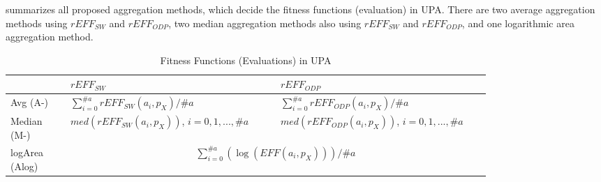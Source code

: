 
 summarizes all proposed aggregation methods, which decide the fitness functions (evaluation) in UPA. There are two average aggregation methods using $rEFF_{SW}$ and $rEFF_{ODP}$, two median aggregation methods also using $rEFF_{SW}$ and $rEFF_{ODP}$, and one logarithmic area aggregation method. 


\begin{table}[h]
	\caption{Fitness Functions (Evaluations) in UPA}
	\vspace{-8pt}
	\label{tab:fit}
	\centering
	\begin{tabular}{p{0.10\linewidth}|p{0.35\linewidth}|p{0.35\linewidth}}
		\toprule
		& $rEFF_{SW}$ & $rEFF_{ODP}$ \\
		\midrule
		\hline
		Avg (A-)& \(\displaystyle \sum_{i=0}^{\#a} rEFF_{SW}(a_{i}, p_{X})/\#a \) & \(\displaystyle\sum_{i=0}^{\#a} rEFF_{ODP}(a_{i}, p_{X})/\#a \)\\
		\hline
		
		Median (M-) & \(\displaystyle med(rEFF_{SW}(a_{i}, p_{X})) \),  $i = 0,1,...,\#a$  &	\(\displaystyle med(rEFF_{ODP}(a_{i}, p_{X})) \),  $i = 0,1,...,\#a$ \\
		
		\hline
		logArea (Alog)& \multicolumn{2}{c}{\(\displaystyle \sum_{i=0}^{\#a} ( \log (EFF(a_{i}, p_{X})) ) / \#a \)}\\
		\bottomrule
	\end{tabular}
\end{table}